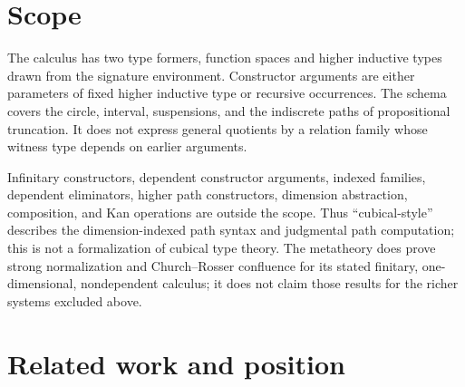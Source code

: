 \documentclass[11pt,a4paper]{article}
\begin{document}
\begin{abstract}
The structural metatheory proves dimension-context weakening, de Bruijn
weakening, capture-avoiding term substitution, dimension substitution, and
one-step and multi-step preservation of raw typing and hereditary safety.
Every raw well-typed term is strongly normalizing. Local confluence on regular
terms, together with typing regularity and strong normalization, yields
Church--Rosser confluence and unique normal forms. Closed checked terms
therefore reach canonical normal forms; at higher inductive type these are
point constructors with canonical arguments. A signature with no point
constructors has no closed checked inhabitant.
\end{abstract}

\tableofcontents

\section{Scope}

The calculus has two type formers, function spaces and higher inductive types
drawn from the signature environment. Constructor arguments are either
parameters of fixed higher inductive type or recursive occurrences. The schema
covers the circle, interval, suspensions, and the indiscrete paths of
propositional truncation. It does not express general quotients by a relation
family whose witness type depends on earlier arguments.

Infinitary constructors, dependent constructor arguments, indexed families,
dependent eliminators, higher path constructors, dimension abstraction,
composition, and Kan operations are outside the scope. Thus ``cubical-style''
describes the dimension-indexed path syntax and judgmental path computation;
this is not a formalization of cubical type theory. The metatheory does prove
strong normalization and Church--Rosser confluence for its stated finitary,
one-dimensional, nondependent calculus; it does not claim those results for
the richer systems excluded above.

\section{Related work and position}
\end{document}
